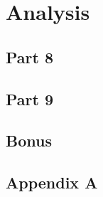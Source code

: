 \documentclass[12pt]{article}
\begin{document}
    \section{Analysis}
    
    \subsection{Part 8}
    
    \subsection{Part 9}
    
    \subsection{Bonus}
    
	\begin{appendices}
    
        \section{Appendix A}
        
    \end{appendices}
\end{document}
